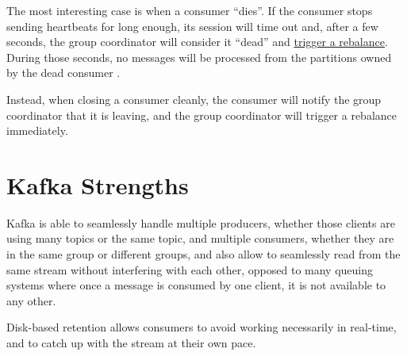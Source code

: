 The most interesting case is when a consumer ``dies''.
If the consumer stops sending heartbeats for long enough, its session will time
out and, after a few seconds, the group coordinator will consider it ``dead'' and \ul{trigger a rebalance}.
During those seconds, no messages will be processed from the partitions owned by the dead consumer \frownie.

Instead, when closing a consumer cleanly, the consumer will notify the group coordinator that it is leaving, and the group coordinator will trigger a rebalance immediately.

\section{Kafka Strengths}
Kafka is able to seamlessly handle multiple producers, whether those clients
are using many topics or the same topic, and multiple consumers, whether they are in the same group or different groups, and also allow to seamlessly read from the same stream without interfering with each other, opposed to many queuing systems where once a message is consumed by one client, it is not available to any other.

Disk-based retention allows consumers to avoid working necessarily in real-time, and to catch up with the stream at their own pace.